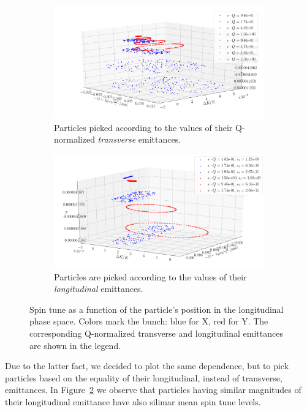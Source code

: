 \begin{figure}[h]
  \centering
  \begin{subfigure}{\linewidth}
    \includegraphics[height=.3\paperheight]{images/stune_traj_equ/part2/3D_plot_all_ps_vars}
    \caption{Particles picked according to the values of their Q-normalized \emph{transverse}
    emittances.\label{fig:main:all_ps}}
  \end{subfigure}
  \begin{subfigure}{\linewidth}
    \includegraphics[height=.3\paperheight]{images/stune_traj_equ/part2/3D_plot_all_ps_vars_equal_long_emi}
    \caption{Particles are picked according to the values of their \emph{longitudinal}
    emittances.\label{fig:main:gamma_eff}}
  \end{subfigure}
  \caption{Spin tune as a function of the particle's position in the longitudinal phase space.
    Colors mark the bunch: blue for X, red for Y. The corresponding Q-normalized transverse and
    longitudinal emittances are shown in the legend.\label{fig:main}}
\end{figure}

Due to the latter fact, we decided to plot the same dependence, but to pick particles based on the equality of
their longitudinal, instead of transverse, emittances. In Figure~\ref{fig:main:gamma_eff} we observe that
particles having similar magnitudes of their longitudinal emittance have also silimar mean spin tune levels.

